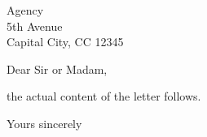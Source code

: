 \documentclass[fromalign=right,addrfield=true,
  foldmarks=true]{scrlttr2}
\date{\today}
\begin{document}
\begin{letter}{Agency \\ 5th Avenue \\ Capital City, CC 12345}
\opening{Dear Sir or Madam,}
the actual content of the letter follows.
\closing{Yours sincerely}
\end{letter} 
\end{document}
